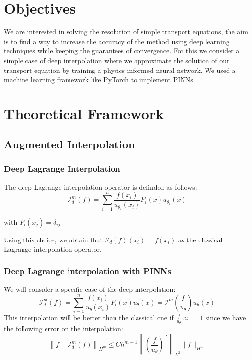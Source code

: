 \documentclass{article}
\begin{document}
\section{Objectives}

We are interested in solving the resolution of simple transport equations, the aim is to find a way to increase the accuracy of the method using deep learning techniques while keeping the guarantees of convergence.
For this we consider a simple case of deep interpolation where we approximate the solution of our transport equation by training a physics informed neural network.
We used a machine learning framework like PyTorch to implement PINNs

\section{Theoretical Framework}

\subsection{Augmented Interpolation}

\subsubsection{Deep Lagrange Interpolation}
The deep Lagrange interpolation operator is definded as follows:
\begin{equation*}
    \mathcal{I}_d^m(f)=\sum_{i=1}^n \frac{f\left(x_i\right)}{u_{\theta_i}\left(x_i\right)} P_i(x) u_{\theta_i}(x)
\end{equation*}

with $P_i\left(x_j\right)=\delta_{i j}$

Using this choice, we obtain that $\mathcal{I}_d(f)\left(x_i\right)=f\left(x_i\right)$ as the classical Lagrange interpolation operator. 

\subsubsection{Deep Lagrange interpolation with PINNs}

We will consider a specific case of the deep interpolation:
$$
\mathcal{I}_d^m(f)=\sum_{i=1}^n \frac{f\left(x_i\right)}{u_\theta\left(x_i\right)} P_i(x) u_\theta(x)=\mathcal{I}^m\left(\frac{f}{u_\theta}\right) u_\theta(x)
$$
This interpolation will be better than the classical one if $\frac{f}{u_\theta} \approx=1$ since we have the following error on the interpolation:
$$
\left\|f-\mathcal{I}_d^m(f)\right\|_{H^m} \leq C h^{m+1}\left\|\left(\frac{f}{u_\theta}\right)^{\prime \prime}\right\|_{L^2}\|f\|_{H^m}
$$
\end{document}
